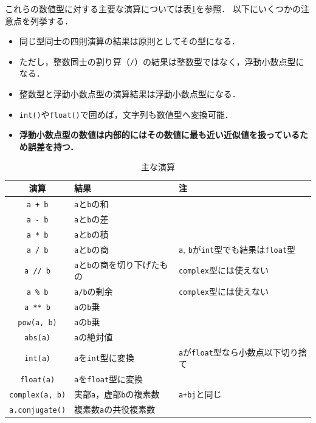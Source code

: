 \documentclass[a4paper,12pt]{jsarticle}
\begin{document}
これらの数値型に対する主要な演算については表\ref{tab:computations}を参照．
以下にいくつかの注意点を列挙する．
\begin{itemize}
    \item 同じ型同士の四則演算の結果は原則としてその型になる．
    \item ただし，整数同士の割り算（\texttt{/}）の結果は整数型ではなく，浮動小数点型になる．
    \item 整数型と浮動小数点型の演算結果は浮動小数点型になる．
    \item \texttt{int()}や\texttt{float()}で囲めば，文字列も数値型へ変換可能．
    \item {\bf 浮動小数点型の数値は内部的にはその数値に最も近い近似値を扱っているため誤差を持つ．}
\end{itemize}
\begin{table}[H]
    \centering
    \caption{主な演算}
    \begin{tabular}{c|l|l}
        \hline
        演算 & 結果 & 注 \\
        \hline\hline
        \texttt{a + b} & \texttt{a}と\texttt{b}の和 & \\
        \texttt{a - b} & \texttt{a}と\texttt{b}の差 & \\
        \texttt{a * b} & \texttt{a}と\texttt{b}の積 & \\
        \texttt{a / b} & \texttt{a}と\texttt{b}の商 & \texttt{a}, \texttt{b}が\texttt{int}型でも結果は\texttt{float}型\\
        \texttt{a // b} & \texttt{a}と\texttt{b}の商を切り下げたもの & \texttt{complex}型には使えない\\
        \texttt{a \% b} & \texttt{a/b}の剰余 & \texttt{complex}型には使えない\\
        \texttt{a ** b} & \texttt{a}の\texttt{b}乗 & \\
        \texttt{pow(a, b)} & \texttt{a}の\texttt{b}乗 & \\
        \texttt{abs(a)} & \texttt{a}の絶対値 & \\
        \texttt{int(a)} & \texttt{a}を\texttt{int}型に変換 & \texttt{a}が\texttt{float}型なら小数点以下切り捨て\\
        \texttt{float(a)} & \texttt{a}を\texttt{float}型に変換 & \\
        \texttt{complex(a, b)} & 実部\texttt{a}，虚部\texttt{b}の複素数 & \texttt{a+bj}と同じ \\
        \texttt{a.conjugate()} & 複素数\texttt{a}の共役複素数 & \\
        \hline
    \end{tabular}
    \label{tab:computations}
\end{table}
\end{document}
